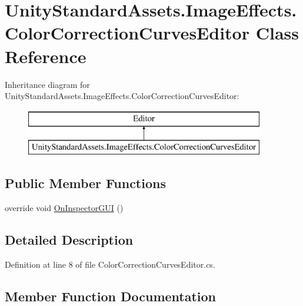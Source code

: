 \hypertarget{class_unity_standard_assets_1_1_image_effects_1_1_color_correction_curves_editor}{}\section{Unity\+Standard\+Assets.\+Image\+Effects.\+Color\+Correction\+Curves\+Editor Class Reference}
\label{class_unity_standard_assets_1_1_image_effects_1_1_color_correction_curves_editor}
Inheritance diagram for Unity\+Standard\+Assets.\+Image\+Effects.\+Color\+Correction\+Curves\+Editor\+:\begin{figure}[H]
\begin{center}
\leavevmode
\includegraphics[height=2.000000cm]{class_unity_standard_assets_1_1_image_effects_1_1_color_correction_curves_editor}
\end{center}
\end{figure}
\subsection*{Public Member Functions}
\begin{DoxyCompactItemize}
\item 
override void \mbox{\hyperlink{class_unity_standard_assets_1_1_image_effects_1_1_color_correction_curves_editor_af8caa3a7c462c3715f5ce86e9fa24a4d}{On\+Inspector\+G\+UI}} ()
\end{DoxyCompactItemize}


\subsection{Detailed Description}


Definition at line 8 of file Color\+Correction\+Curves\+Editor.\+cs.



\subsection{Member Function Documentation}
\mbox{\label{class_unity_standard_assets_1_1_image_effects_1_1_color_correction_curves_editor_af8caa3a7c462c3715f5ce86e9fa24a4d}} 
